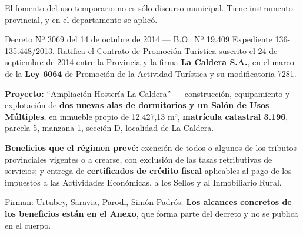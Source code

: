 El fomento del uso temporario no es sólo discurso municipal. Tiene instrumento provincial, y en el departamento se aplicó.

\begin{ficha}{Decreto Nº 3069 del 14 de octubre de 2014 --- B.O.\ Nº 19.409}
Expediente 136-135.448/2013. Ratifica el Contrato de Promoción Turística suscrito el 24 de septiembre de 2014 entre la Provincia y la firma \textbf{La Caldera S.A.}, en el marco de la \textbf{Ley 6064} de Promoción de la Actividad Turística y su modificatoria 7281.

\textbf{Proyecto:} ``Ampliación Hostería La Caldera'' --- construcción, equipamiento y explotación de \textbf{dos nuevas alas de dormitorios y un Salón de Usos Múltiples}, en inmueble propio de 12.427,13 m², \textbf{matrícula catastral 3.196}, parcela 5, manzana 1, sección D, localidad de La Caldera.

\textbf{Beneficios que el régimen prevé:} exención de todos o algunos de los tributos provinciales vigentes o a crearse, con exclusión de las tasas retributivas de servicios; y entrega de \textbf{certificados de crédito fiscal} aplicables al pago de los impuestos a las Actividades Económicas, a los Sellos y al Inmobiliario Rural.

Firman: Urtubey, Saravia, Parodi, Simón Padrós. \textbf{Los alcances concretos de los beneficios están en el Anexo}, que forma parte del decreto y no se publica en el cuerpo.
\end{ficha}

